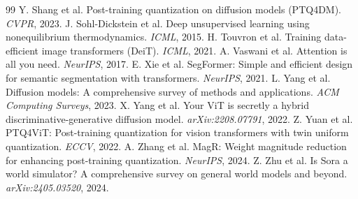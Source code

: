 \documentclass[10pt,a4paper]{article}
\begin{document}
\begin{thebibliography}{99}
 Y. Shang et al. Post-training quantization on diffusion models (PTQ4DM). \textit{CVPR}, 2023.
 J. Sohl-Dickstein et al. Deep unsupervised learning using nonequilibrium thermodynamics. \textit{ICML}, 2015.
 H. Touvron et al. Training data-efficient image transformers (DeiT). \textit{ICML}, 2021.
 A. Vaswani et al. Attention is all you need. \textit{NeurIPS}, 2017.
 E. Xie et al. SegFormer: Simple and efficient design for semantic segmentation with transformers. \textit{NeurIPS}, 2021.
 L. Yang et al. Diffusion models: A comprehensive survey of methods and applications. \textit{ACM Computing Surveys}, 2023.
 X. Yang et al. Your ViT is secretly a hybrid discriminative-generative diffusion model. \textit{arXiv:2208.07791}, 2022.
 Z. Yuan et al. PTQ4ViT: Post-training quantization for vision transformers with twin uniform quantization. \textit{ECCV}, 2022.
 A. Zhang et al. MagR: Weight magnitude reduction for enhancing post-training quantization. \textit{NeurIPS}, 2024.
 Z. Zhu et al. Is Sora a world simulator? A comprehensive survey on general world models and beyond. \textit{arXiv:2405.03520}, 2024.
\end{thebibliography}
\end{document}
